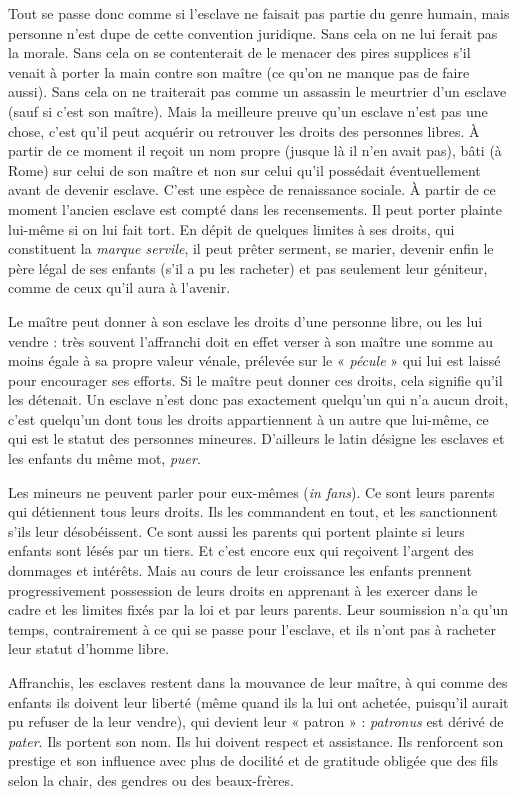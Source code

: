 Tout se passe donc comme si l'esclave ne faisait pas partie du genre
humain, mais personne n'est dupe de cette convention juridique. Sans
cela on ne lui ferait pas la morale. Sans cela on se contenterait de le menacer
des pires supplices s'il venait à porter la main contre son maître (ce
qu'on ne manque pas de faire aussi). Sans cela on ne traiterait pas comme
un assassin le meurtrier d'un esclave (sauf si c'est son maître). Mais la
meilleure preuve qu'un esclave n'est pas une chose, c'est qu'il peut acquérir
ou retrouver les droits des personnes libres. À partir de ce moment il
reçoit un nom propre (jusque là il n'en avait pas), bâti (à Rome) sur celui
de son maître et non sur celui qu'il possédait éventuellement avant de
devenir esclave. C'est une espèce de renaissance sociale. À partir de ce
moment l'ancien esclave est compté dans les recensements. Il peut porter
plainte lui-même si on lui fait tort. En dépit de quelques limites à ses
droits, qui constituent la \emph{marque servile}, il peut prêter serment, se marier,
devenir enfin le père légal de ses enfants (s'il a pu les racheter) et pas seulement
leur géniteur, comme de ceux qu'il aura à l'avenir.

Le maître peut donner à son esclave les droits d'une personne libre,
ou les lui vendre : très souvent l'affranchi doit en effet verser à son
maître une somme au moins égale à sa propre valeur vénale, prélevée sur
le « \emph{pécule} » qui lui est laissé pour encourager ses efforts. Si le maître peut
donner ces droits, cela signifie qu'il les détenait. Un esclave n'est donc
pas exactement quelqu'un qui n'a aucun droit, c'est quelqu'un dont tous
les droits appartiennent à un autre que lui-même, ce qui est le statut des
personnes mineures. D'ailleurs le latin désigne les esclaves et les enfants
du même mot, \emph{puer}.

Les mineurs ne peuvent parler pour eux-mêmes (\emph{in fans}). Ce sont
leurs parents qui détiennent tous leurs droits. Ils les commandent en
tout, et les sanctionnent s'ils leur désobéissent. Ce sont aussi les parents
qui portent plainte si leurs enfants sont lésés par un tiers. Et c'est encore
eux qui reçoivent l'argent des dommages et intérêts. Mais au cours de
leur croissance les enfants prennent progressivement possession de leurs
droits en apprenant à les exercer dans le cadre et les limites fixés par la
loi et par leurs parents. Leur soumission n'a qu'un temps, contrairement
à ce qui se passe pour l'esclave, et ils n'ont pas à racheter leur statut
d'homme libre.

Affranchis, les esclaves restent dans la mouvance de
leur maître, à qui comme des enfants ils doivent leur liberté (même
quand ils la lui ont achetée, puisqu'il aurait pu refuser de la leur vendre),
qui devient leur « patron » : \emph{patronus} est dérivé de \emph{pater}. Ils portent son
nom. Ils lui doivent respect et assistance. Ils renforcent son prestige et
son influence avec plus de docilité et de gratitude obligée que des fils selon
la chair, des gendres ou des beaux-frères.

